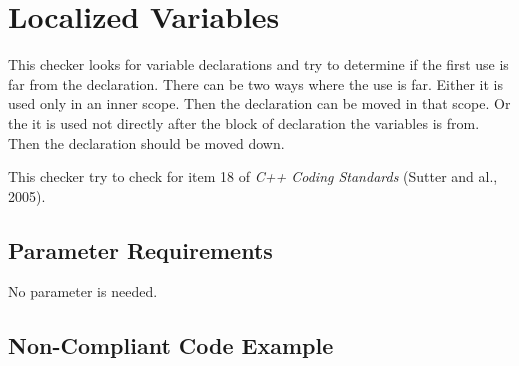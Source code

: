 %
%

\section{Localized Variables}
\label{LocalizedVariables::overview}

This checker looks for variable declarations and try to determine if
the first use is far from the declaration. There can be two ways where
the use is far. Either it is used only in an inner scope. Then the
declaration can be moved in that scope. Or the it is used not directly
after the block of declaration the variables is from. Then the
declaration should be moved down.

This checker try to check for item 18 of \emph{C++ Coding Standards}
(Sutter and al., 2005).

\subsection{Parameter Requirements}

   No parameter is needed.

\subsection{Non-Compliant Code Example}

